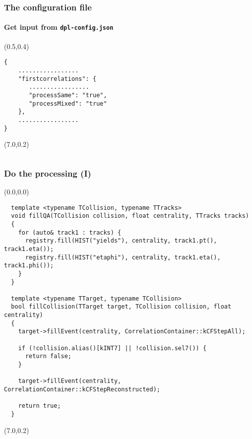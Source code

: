 \documentclass[14pt,aspectratio=169,t]{beamer}
\begin{document}
\begin{frame}[fragile]
  \frametitle{The configuration file}
  \framesubtitle{Get input from \texttt{dpl-config.json}}
  \begin{textblock}{6}(0.5,0.4)
    {\scriptsize\color{blue}
    \vspace{-0.0in}
    \begin{verbatim}
{
    .................
    "firstcorrelations": {
       .................
       "processSame": "true",
       "processMixed": "true"
    },
    .................
}    
    \end{verbatim}}
  \end{textblock}
  \begin{textblock}{6}(7.0,0.2)
    {\tiny\color{blue}
    \vspace{-0.0in}
    \begin{verbatim}
    \end{verbatim}}
  \end{textblock}
\end{frame}

\begin{frame}[fragile]
  \frametitle{Do the processing (I)}
  \begin{textblock}{6}(0.0,0.0)
    {\tiny\color{blue}
    \vspace{-0.0in}
    \begin{verbatim}
  template <typename TCollision, typename TTracks>
  void fillQA(TCollision collision, float centrality, TTracks tracks)
  {
    for (auto& track1 : tracks) {
      registry.fill(HIST("yields"), centrality, track1.pt(), track1.eta());
      registry.fill(HIST("etaphi"), centrality, track1.eta(), track1.phi());
    }
  }

  template <typename TTarget, typename TCollision>
  bool fillCollision(TTarget target, TCollision collision, float centrality)
  {
    target->fillEvent(centrality, CorrelationContainer::kCFStepAll);

    if (!collision.alias()[kINT7] || !collision.sel7()) {
      return false;
    }

    target->fillEvent(centrality, CorrelationContainer::kCFStepReconstructed);

    return true;
  }
    \end{verbatim}}
  \end{textblock}
  \begin{textblock}{6}(7.0,0.2)
    {\tiny\color{blue}
    \vspace{-0.0in}
    \begin{verbatim}
    \end{verbatim}}
  \end{textblock}
\end{frame}
\end{document}
